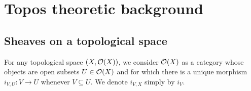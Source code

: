\documentclass[11pt, oneside, article]{memoir}
\theoremstyle{plain}
\theoremstyle{definition}
\theoremstyle{remark}
\newtheorem{example}[theorem]{Example}
\renewcommand{\ss}{\subseteq}
\newcommand{\Set}[1]{\mathrm{#1}}
\newcommand{\wh}[1]{\widehat{#1}}
\newcommand{\Op}[1][undef]{\ifthenelse{\equal{#1}{undef}}{\mathcal{O}}{\mathcal{O}(#1)}}
\newcommand{\cpct}[1]{\Set{Cpct}_{#1}}
\newcommand{\pt}{k}				%
\newcommand{\bas}[1]{\wh{#1}}
\begin{document}
\appendix

\chapter{Topos theoretic background}\label{sec.topos_background}
%
%
%
%
\section{Sheaves on a topological space}

For any topological space $(X,\Op[X])$, we consider $\Op[X]$ as a category whose objects are open subsets $U\in\Op[X]$ and for which there is a unique morphism $i_{V,U}\colon V\to U$ whenever $V\ss U$. We denote $i_{V,X}$ simply by $i_V$.
\end{document}
